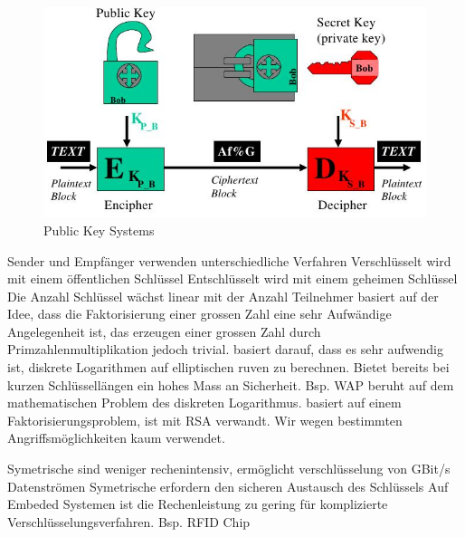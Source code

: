 \documentclass[ngerman,a4paper,12pt]{scrreprt}
\begin{document}
\begin{figure}[H]
	\centering
	\includegraphics[width=\textwidth]{img/V5.3.jpg}
	\caption{Public Key Systems}
	\label{}
\end{figure}
\ul
	\li Sender und Empfänger verwenden unterschiedliche Verfahren
	\li Verschlüsselt wird mit einem öffentlichen Schlüssel
	\li Entschlüsselt wird mit einem geheimen Schlüssel
	\li Die Anzahl Schlüssel wächst linear mit der Anzahl Teilnehmer
\ulE
{}
\dl
	 basiert auf der Idee, dass die Faktorisierung einer grossen Zahl eine sehr Aufwändige Angelegenheit ist, das erzeugen einer grossen Zahl durch Primzahlenmultiplikation jedoch trivial.
	 basiert darauf, dass es sehr aufwendig ist, diskrete Logarithmen auf elliptischen ruven zu berechnen. Bietet bereits bei kurzen Schlüssellängen ein hohes Mass an Sicherheit. Bsp. WAP
	 beruht auf dem mathematischen Problem des diskreten Logarithmus.
	 basiert auf einem Faktorisierungsproblem, ist mit RSA verwandt. Wir wegen bestimmten Angriffsmöglichkeiten kaum verwendet.
\dlE

\ul
	\li Symetrische sind weniger rechenintensiv, ermöglicht verschlüsselung von GBit/s Datenströmen
	\li Symetrische erfordern den sicheren Austausch des Schlüssels
	\li Auf Embeded Systemen ist die Rechenleistung zu gering für komplizierte Verschlüsselungsverfahren. Bsp. RFID Chip
\ulE
\end{document}

